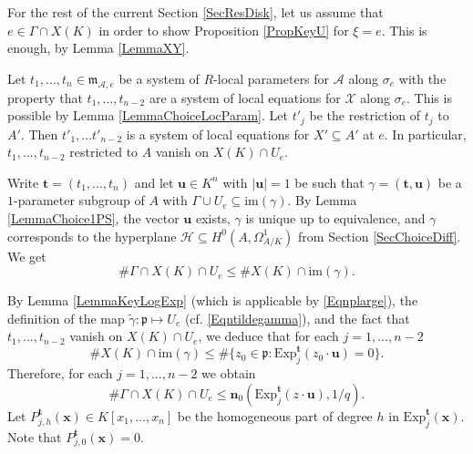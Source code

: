 \documentclass[11pt]{amsart}
\theoremstyle{remark}
\numberwithin{equation}{section}
\newcommand{\pfrak}{\mathfrak{p}}
\newcommand{\mfrak}{\mathfrak{m}}
\newcommand{\Acal}{\mathscr{A}}
\newcommand{\Hcal}{\mathscr{H}}
\newcommand{\Xcal}{\mathscr{X}}
\newcommand{\nn}{\mathbf{n}}
\newcommand{\xx}{\mathbf{x}}
\newcommand{\ttt}{\mathbf{t}}
\newcommand{\uu}{\mathbf{u}}
\newcommand{\Exp}{\mathrm{Exp}}
\newcommand{\im}{\mathrm{im}}
\begin{document}
For the rest of the current Section \ref{SecResDisk}, let us assume that $e\in \Gamma\cap X(K)$ in order to show Proposition \ref{PropKeyU} for $\xi=e$. This is enough, by Lemma \ref{LemmaXY}.

Let $t_1,...,t_n\in \mfrak_{\Acal, e}$ be a system of $R$-local parameters for $\Acal$ along $\sigma_e$ with the property that $t_1, ..., t_{n-2}$ are a system of local equations for $\Xcal$ along $\sigma_e$. This is possible by Lemma \ref{LemmaChoiceLocParam}. Let $t'_j$ be the restriction of $t_j$ to $A'$. Then $t'_1,...t'_{n-2}$ is a system of local equations for $X'\subseteq A'$ at $e$. In particular, $t_1,...,t_{n-2}$ restricted to $A$ vanish on $X(K)\cap U_e$.


Write $\ttt=(t_1,...,t_n)$ and let $\uu\in K^n$ with $|\uu |=1$ be such that $\gamma=(\ttt,\uu)$ be a $1$-parameter subgroup of $A$ with $\Gamma\cup U_e\subseteq \im(\gamma)$. By Lemma \ref{LemmaChoice1PS}, the vector $\uu$  exists, $\gamma$ is unique up to equivalence, and $\gamma$ corresponds to the hyperplane $\Hcal\subseteq H^0(A,\Omega^1_{A/K})$ from Section \ref{SecChoiceDiff}. We get
$$
\# \Gamma\cap X(K)\cap U_e \le \# X(K)\cap \im(\gamma).
$$

By Lemma \ref{LemmaKeyLogExp} (which is applicable by \eqref{Eqnplarge}), the definition of the map $\tilde{\gamma}:\pfrak\mapsto U_e$ (cf. \eqref{Eqntildegamma}), and the fact that $t_1,...,t_{n-2}$ vanish on $X(K)\cap U_e$, we deduce that for each $j=1,...,n-2$
$$
 \# X(K)\cap \im(\gamma)\le \#\{z_0\in \pfrak : \Exp_j^\ttt(z_0\cdot \uu)=0\}.
$$
Therefore, for each $j=1,..., n-2$ we obtain
\begin{equation}\label{EqnBdUn0}
\# \Gamma\cap X(K)\cap U_e \le \nn_0(\Exp_j^\ttt(z\cdot \uu), 1/q).
\end{equation}
Let $P^\ttt_{j,h}(\xx)\in K[x_1,...,x_n]$ be the homogeneous part of degree $h$ in $\Exp_j^\ttt(\xx)$. Note that $P^\ttt_{j,0}(\xx)=0$.
\end{document}
